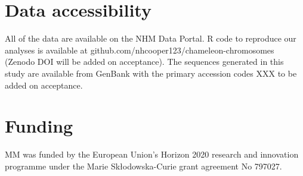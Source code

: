 \documentclass[a4paper, 12pt]{article}
\begin{document}
\section*{Data accessibility}\label{data-code-and-materials}
All of the data are available on the NHM Data Portal\cite{chameleon-data}. 
R code to reproduce our analyses is available at github.com/nhcooper123/chameleon-chromosomes (Zenodo DOI will be added on acceptance\cite{coopercode2022}). 
The sequences generated in this study are available from GenBank with the primary accession codes XXX to be added on acceptance.

\section*{Funding}
MM was funded by the European Union’s Horizon 2020 research and innovation programme under the Marie Sk\l{}odowska-Curie grant agreement No 797027.



\end{document}
